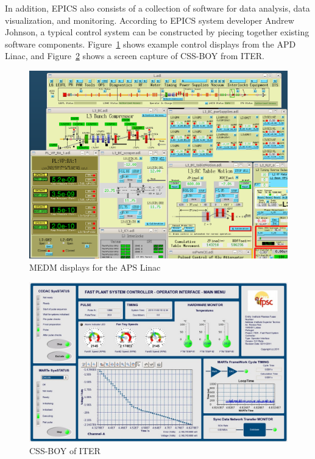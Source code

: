 In addition, EPICS also consists of a collection of software for data analysis, data visualization, and monitoring. According to EPICS system developer Andrew Johnson, a typical control system can be constructed by piecing together existing software components\cite{lecture:johnson_intro_to_epics}. Figure~\ref{aps-linac} shows example control displays from the APD Linac, and Figure~\ref{css-boy-iter} shows a screen capture of CSS-BOY from ITER.


\begin{figure}[h]
\begin{center}
\includegraphics[width=5.5in]{figures/aps_linac.png}
\caption{MEDM displays for the APS Linac \label{aps-linac}}
\end{center}
\end{figure}

\begin{figure}[h]
\begin{center}
\includegraphics[width=5.5in]{figures/css-boy-iter.png}
\caption{CSS-BOY of ITER \label{css-boy-iter}}
\end{center}
\end{figure}

